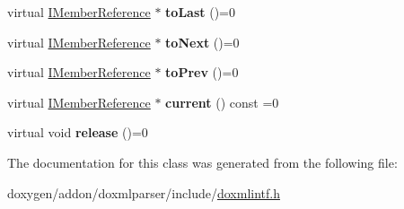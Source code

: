 \begin{DoxyCompactItemize}
virtual \mbox{\hyperlink{class_i_member_reference}{I\+Member\+Reference}} $\ast$ {\bfseries to\+Last} ()=0
\item 
\mbox{\label{class_i_member_reference_iterator_a45d2a1cddd36ba3231b9052b46612ce2}} 
virtual \mbox{\hyperlink{class_i_member_reference}{I\+Member\+Reference}} $\ast$ {\bfseries to\+Next} ()=0
\item 
\mbox{\label{class_i_member_reference_iterator_ae1aee254fc598d0f5b380c6b00d6cea6}} 
virtual \mbox{\hyperlink{class_i_member_reference}{I\+Member\+Reference}} $\ast$ {\bfseries to\+Prev} ()=0
\item 
\mbox{\label{class_i_member_reference_iterator_ad4e37c5a05a092d5c302b7fee6c1a5a2}} 
virtual \mbox{\hyperlink{class_i_member_reference}{I\+Member\+Reference}} $\ast$ {\bfseries current} () const =0
\item 
\mbox{\label{class_i_member_reference_iterator_a3d231c536f882fdc4d7957612a09a278}} 
virtual void {\bfseries release} ()=0
\end{DoxyCompactItemize}


The documentation for this class was generated from the following file\+:\begin{DoxyCompactItemize}
\item 
doxygen/addon/doxmlparser/include/\mbox{\hyperlink{include_2doxmlintf_8h}{doxmlintf.\+h}}\end{DoxyCompactItemize}
